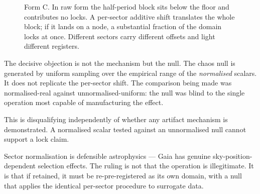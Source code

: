 \documentclass[11pt, letterpaper, openany]{book}
\begin{document}
\begin{figure}[H]
\centering
{}
\caption{Form C. In raw form the half-period block sits below the floor and contributes no
locks. A per-sector additive shift translates the whole block; if it lands on a node, a
substantial fraction of the domain locks at once. Different sectors carry different offsets and
light different registers.}
\end{figure}

\begin{warningbox}
The decisive objection is not the mechanism but the null. The chaos null is generated by uniform
sampling over the empirical range of the \emph{normalised} scalars. It does not replicate the
per-sector shift. The comparison being made was normalised-real against unnormalised-uniform:
the null was blind to the single operation most capable of manufacturing the effect.

\medskip
\noindent This is disqualifying independently of whether any artifact mechanism is
demonstrated. A normalised scalar tested against an unnormalised null cannot support a lock
claim.
\end{warningbox}

Sector normalisation is defensible astrophysics --- Gaia has genuine sky-position-dependent
selection effects. The ruling is not that the operation is illegitimate. It is that if retained,
it must be re-pre-registered as its own domain, with a null that applies the identical
per-sector procedure to surrogate data.
\end{document}
